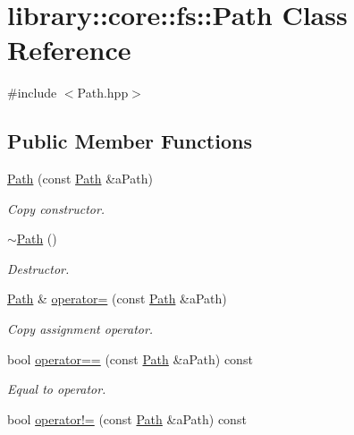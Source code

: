 \hypertarget{classlibrary_1_1core_1_1fs_1_1_path}{}\section{library\+::core\+::fs\+::Path Class Reference}
\label{classlibrary_1_1core_1_1fs_1_1_path}


{\ttfamily \#include $<$Path.\+hpp$>$}

\subsection*{Public Member Functions}
\begin{DoxyCompactItemize}
\item 
\mbox{\hyperlink{classlibrary_1_1core_1_1fs_1_1_path_aabc4240fc08479d1bff6b9753f2b5cc2}{Path}} (const \mbox{\hyperlink{classlibrary_1_1core_1_1fs_1_1_path}{Path}} \&a\+Path)
\begin{DoxyCompactList}\small\item\em Copy constructor. \end{DoxyCompactList}\item 
\mbox{\hyperlink{classlibrary_1_1core_1_1fs_1_1_path_aa120129d701f0b2366d805f73000cbc6}{$\sim$\+Path}} ()
\begin{DoxyCompactList}\small\item\em Destructor. \end{DoxyCompactList}\item 
\mbox{\hyperlink{classlibrary_1_1core_1_1fs_1_1_path}{Path}} \& \mbox{\hyperlink{classlibrary_1_1core_1_1fs_1_1_path_a23879402c7612f8374251613acfe0f62}{operator=}} (const \mbox{\hyperlink{classlibrary_1_1core_1_1fs_1_1_path}{Path}} \&a\+Path)
\begin{DoxyCompactList}\small\item\em Copy assignment operator. \end{DoxyCompactList}\item 
bool \mbox{\hyperlink{classlibrary_1_1core_1_1fs_1_1_path_add705556eb4509ab2868e322490a1e35}{operator==}} (const \mbox{\hyperlink{classlibrary_1_1core_1_1fs_1_1_path}{Path}} \&a\+Path) const
\begin{DoxyCompactList}\small\item\em Equal to operator. \end{DoxyCompactList}\item 
bool \mbox{\hyperlink{classlibrary_1_1core_1_1fs_1_1_path_a79b3a6951753c591bab57ee41f7c4c6f}{operator!=}} (const \mbox{\hyperlink{classlibrary_1_1core_1_1fs_1_1_path}{Path}} \&a\+Path) const

\end{DoxyCompactItemize}
